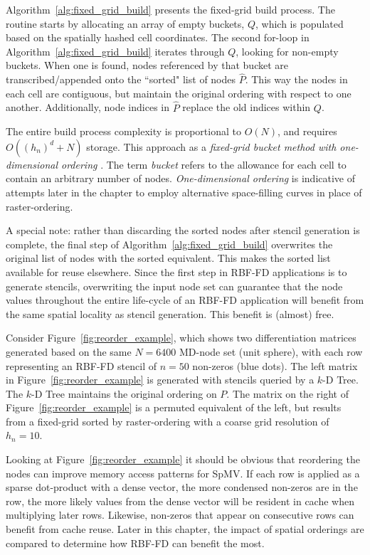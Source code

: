 \documentclass{report}
\begin{document}
Algorithm~\ref{alg:fixed_grid_build} presents the fixed-grid build process. The routine starts by allocating an array of empty buckets, $Q$, which is populated based on the spatially hashed cell coordinates. The second for-loop in Algorithm~\ref{alg:fixed_grid_build} iterates through $Q$, looking for non-empty buckets. When one is found, nodes referenced by that bucket are transcribed/appended onto the ``sorted" list of nodes $\hat{P}$. This way the nodes in each cell are contiguous, but maintain the original ordering with respect to one another. Additionally, node indices in $\hat{P}$ replace the old indices within $Q$.

The entire build process complexity is proportional to $O(N)$, and requires $O((h_n)^d + N)$ storage. This approach as a \emph{fixed-grid bucket method with one-dimensional ordering} \cite{Samet2005}. The term \emph{bucket} refers to the allowance for each cell to contain an arbitrary number of nodes. \emph{One-dimensional ordering} is indicative of attempts later in the chapter to employ alternative space-filling curves in place of raster-ordering. 

A special note: rather than discarding the sorted nodes after stencil generation is complete, the final step of Algorithm~\ref{alg:fixed_grid_build} overwrites the original list of nodes with the sorted equivalent. This makes the sorted list available for reuse elsewhere. Since the first step in RBF-FD applications is to generate stencils, overwriting the input node set can guarantee that the node values throughout the entire life-cycle of an RBF-FD application will benefit from the same spatial locality as stencil generation. This benefit is (almost) free. 

Consider Figure~\ref{fig:reorder_example}, which shows two differentiation matrices generated based on the same $N=6400$ MD-node set (unit sphere), with each row representing an RBF-FD stencil of $n=50$ non-zeros (blue dots). The left matrix in Figure~\ref{fig:reorder_example} is generated with stencils queried by a $k$-D Tree. The $k$-D Tree maintains the original ordering on $P$. The matrix on the right of Figure~\ref{fig:reorder_example} is a permuted equivalent of the left, but results from a fixed-grid sorted by raster-ordering with a coarse grid resolution of $h_n = 10$. 

Looking at Figure~\ref{fig:reorder_example} it should be obvious that reordering the nodes can improve memory access patterns for SpMV. If each row is applied as a sparse dot-product with a dense vector, the more condensed non-zeros are in the row, the more likely values from the dense vector will be resident in cache when multiplying later rows. Likewise, non-zeros that appear on consecutive rows can benefit from cache reuse. Later in this chapter, the impact of spatial orderings are compared to determine how RBF-FD can benefit the most. 
\end{document}
